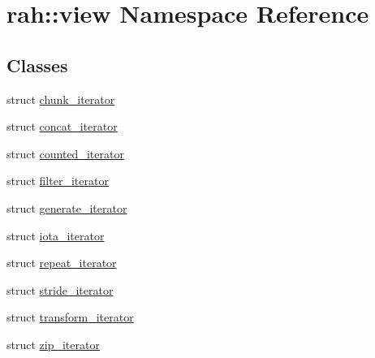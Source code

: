 \hypertarget{namespacerah_1_1view}{}\section{rah\+::view Namespace Reference}
\label{namespacerah_1_1view}
\subsection*{Classes}
\begin{DoxyCompactItemize}
\item 
struct \mbox{\hyperlink{structrah_1_1view_1_1chunk__iterator}{chunk\+\_\+iterator}}
\item 
struct \mbox{\hyperlink{structrah_1_1view_1_1concat__iterator}{concat\+\_\+iterator}}
\item 
struct \mbox{\hyperlink{structrah_1_1view_1_1counted__iterator}{counted\+\_\+iterator}}
\item 
struct \mbox{\hyperlink{structrah_1_1view_1_1filter__iterator}{filter\+\_\+iterator}}
\item 
struct \mbox{\hyperlink{structrah_1_1view_1_1generate__iterator}{generate\+\_\+iterator}}
\item 
struct \mbox{\hyperlink{structrah_1_1view_1_1iota__iterator}{iota\+\_\+iterator}}
\item 
struct \mbox{\hyperlink{structrah_1_1view_1_1repeat__iterator}{repeat\+\_\+iterator}}
\item 
struct \mbox{\hyperlink{structrah_1_1view_1_1stride__iterator}{stride\+\_\+iterator}}
\item 
struct \mbox{\hyperlink{structrah_1_1view_1_1transform__iterator}{transform\+\_\+iterator}}
\item 
struct \mbox{\hyperlink{structrah_1_1view_1_1zip__iterator}{zip\+\_\+iterator}}
\end{DoxyCompactItemize}
